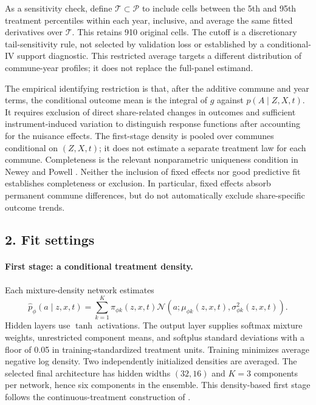 \documentclass{article}
\begin{document}
As a sensitivity check, define $\mathcal T\subset\mathcal P$ to include cells between the 5th and 95th treatment percentiles within each year, inclusive, and average the same fitted derivatives over $\mathcal T$. This retains 910 original cells. The cutoff is a discretionary tail-sensitivity rule, not selected by validation loss or established by a conditional-IV support diagnostic. This restricted average targets a different distribution of commune-year profiles; it does not replace the full-panel estimand.

The empirical identifying restriction is that, after the additive commune and year terms, the conditional outcome mean is the integral of $g$ against $p(A\mid Z,X,t)$. It requires exclusion of direct share-related changes in outcomes and sufficient instrument-induced variation to distinguish response functions after accounting for the nuisance effects. The first-stage density is pooled over communes conditional on $(Z,X,t)$; it does not estimate a separate treatment law for each commune. Completeness is the relevant nonparametric uniqueness condition in Newey and Powell \cite{neweypowell}. Neither the inclusion of fixed effects nor good predictive fit establishes completeness or exclusion. In particular, fixed effects absorb permanent commune differences, but do not automatically exclude share-specific outcome trends.

\subsection*{2. Fit settings}
\paragraph{First stage: a conditional treatment density.}
Each mixture-density network estimates
\begin{equation}
\widehat p_\phi(a\mid z,x,t)
=\sum_{k=1}^{K}\pi_{\phi k}(z,x,t)
\mathcal N\!\left(a;\mu_{\phi k}(z,x,t),\sigma_{\phi k}^2(z,x,t)\right).
\label{eq:neural-density}
\end{equation}
Hidden layers use $\tanh$ activations. The output layer supplies softmax mixture weights, unrestricted component means, and softplus standard deviations with a floor of 0.05 in training-standardized treatment units. Training minimizes average negative log density. Two independently initialized densities are averaged. The selected final architecture has hidden widths $(32,16)$ and $K=3$ components per network, hence six components in the ensemble. This density-based first stage follows the continuous-treatment construction of \cite[Section 3]{deepiv}.
\end{document}
